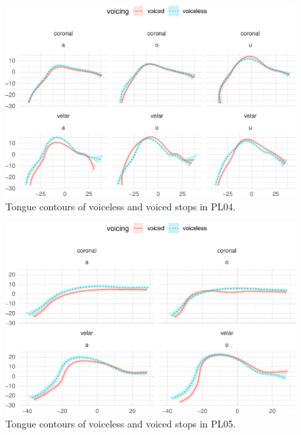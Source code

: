 \documentclass[12pt,]{article}
\begin{document}
\begin{figure}

{\centering \includegraphics[width=.8\textwidth]{2018-polar-gam_files/figure-latex/tongues-pl04-1} 

}

\caption{Tongue contours of voiceless and voiced stops in PL04.}\label{f:tongues-pl04}
\end{figure}

\begin{figure}

{\centering \includegraphics[width=.8\textwidth]{2018-polar-gam_files/figure-latex/tongues-pl05-1} 

}

\caption{Tongue contours of voiceless and voiced stops in PL05.}\label{f:tongues-pl05}
\end{figure}
\end{document}

